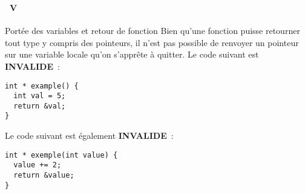\begin{frame}[containsverbatim]
  \frametitle{\secname}
  \framesubtitle{\subsecname~V}

  \begin{alertblock}{Portée des variables et retour de fonction}
    Bien qu'une fonction puisse retourner tout type y compris des pointeurs, il n'est pas possible de renvoyer un pointeur sur une
    variable locale qu'on s'apprête à quitter. Le code suivant est \textbf{INVALIDE}~:
    \begin{verbatim}
int * example() {
  int val = 5;
  return &val;
}\end{verbatim}
    Le code suivant est également \textbf{INVALIDE}~:
    \begin{verbatim}
int * exemple(int value) {
  value += 2;
  return &value;
}\end{verbatim}
  \end{alertblock}
\end{frame}

